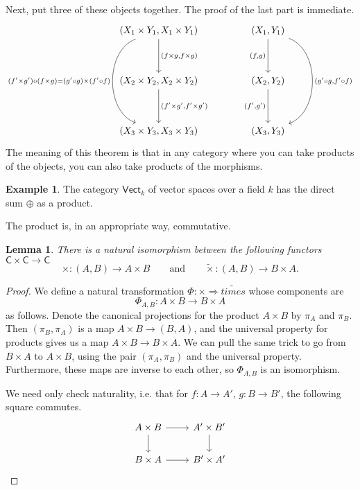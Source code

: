 \documentclass[a4paper]{report}
\theoremstyle{definition}
\newtheorem{example}{Example}[section]
\theoremstyle{plain}
\newtheorem{lemma}{Lemma}[section]
\theoremstyle{remark}
\begin{document}
Next, put three of these objects together. The proof of the last part is immediate.
\begin{equation*}
  \begin{tikzcd}[column sep=huge, row sep=huge]
    {(X_{1} \times Y_{1}, X_{1} \times Y_{1})}  \arrow[d, "{(f\times g, f\times g)}"] \arrow[dd, bend right=70, swap, "{(f'\times g') \circ (f\times g)} = (g' \circ g) \times (f' \circ f)"]  & (X_{1}, Y_{1}) \arrow[d, swap, "{(f,g)}"] \arrow[dd, bend left=70, "{(g'\circ g, f' \circ f)}"] \\
    {(X_{2} \times Y_{2}, X_{2} \times Y_{2})}\arrow[d, "{(f'\times g', f'\times g')}"]  & (X_{2}, Y_{2}) \arrow[d, swap, "{(f',g')}"] \\
    {(X_{3} \times Y_{3}, X_{3} \times Y_{3})}  & (X_{3}, Y_{3})
  \end{tikzcd}
\end{equation*}
The meaning of this theorem is that in any category where you can take products of the objects, you can also take products of the morphisms.

\begin{example}
  The category $\mathsf{Vect}_{k}$ of vector spaces over a field $k$ has the direct sum $\oplus$ as a product. 
\end{example}

The product is, in an appropriate way, commutative.
\begin{lemma}
  There is a natural isomorphism between the following functors $\mathsf{C} \times \mathsf{C} \to \mathsf{C}$
  \begin{equation*}
    \times\colon (A, B) \to A \times B\qquad\text{and}\qquad \tilde{\times}\colon (A, B) \to B \times A.
  \end{equation*}
\end{lemma}
\begin{proof}
  We define a natural transformation $\Phi\colon \times \Rightarrow \tilde{times}$ whose components are 
  \begin{equation*}
    \Phi_{A, B}\colon A \times B \to B \times A
  \end{equation*}
  as follows. Denote the canonical projections for the product $A \times B$ by $\pi_{A}$ and $\pi_{B}$. Then $(\pi_{B}, \pi_{A})$ is a map $A \times B \to (B, A)$, and the universal property for products gives us a map $A \times B \to B \times A$. We can pull the same trick to go from $B \times A$ to $A \times B$, using the pair $(\pi_{A}, \pi_{B})$ and the universal property. Furthermore, these maps are inverse to each other, so $\Phi_{A, B}$ is an isomorphism.

  We need only check naturality, i.e. that for $f\colon A \to A'$, $g\colon B \to B'$, the following square commutes.
  \begin{equation*}
    \begin{tikzcd}
      A \times B
      \arrow[r]
      \arrow[d, swap]
      & A' \times B'
      \arrow[d]
      \\
      B \times A
      \arrow[r]
      & B' \times A'
    \end{tikzcd}
  \end{equation*}
\end{proof}
\end{document}
